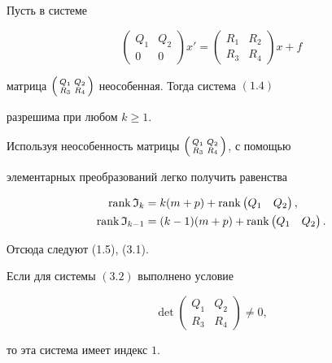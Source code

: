  


\begin{thms} 


Пусть в системе 


\begin{equation} 


\begin{pmatrix} Q_1 & Q_2 \\ 0 & 0 \end{pmatrix}x'= 


\begin{pmatrix} R_1 & R_2 \\ R_3 & R_4\end{pmatrix}x+f 


\end{equation} 


матрица $\left(\begin{smallmatrix}Q_1 & Q_2 \\ R_3 & R_4\end{smallmatrix}\right)$ неособенная. Тогда система $(1.4)$ 


разрешима при любом $k\ge1$. 


\end{thms} 


 


\begin{pf} 


Используя неособенность матрицы $\left(\begin{smallmatrix}Q_1 & Q_2 \\ R_3 & R_4\end{smallmatrix}\right)$, с помощью 


элементарных преобразований легко получить равенства 


\begin{align*} 


\rank\frak I_k&=k(m+p)+\rank\begin{pmatrix} 


Q_1 & Q_2 \end{pmatrix},\\ 


\rank\frak I_{k-1}&=(k-1)(m+p)+\rank 


\begin{pmatrix} Q_1 & Q_2 \end{pmatrix} 


. 


\end{align*} 


Отсюда следуют (1.5), (3.1). 


\end{pf} 


 


\begin{thms} 


Если для системы $(3.2)$ выполнено условие 


$$ 


\det\begin{pmatrix} Q_1 & Q_2 \\ R_3 & R_4 \end{pmatrix}\ne0, 


$$ 


то эта система имеет индекс $1$. 


\end{thms} 


